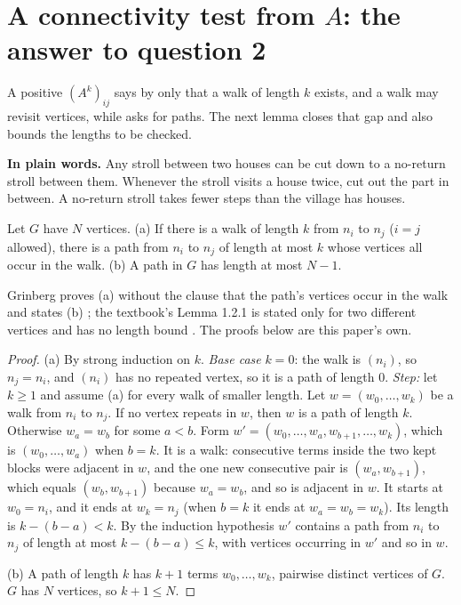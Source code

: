 \section{A connectivity test from $A$: the answer to question 2}\label{sec:connectivity}

A positive $(A^k)_{ij}$ says by  only that a walk of length $k$ exists, and a walk may revisit vertices, while  asks for paths. The next lemma closes that gap and also bounds the lengths to be checked.

\plainstart\textbf{In plain words.} Any stroll between two houses can be cut down to a no-return stroll between them. Whenever the stroll visits a house twice, cut out the part in between. A no-return stroll takes fewer steps than the village has houses.\plainend
\begin{lemma}\label{lem:walkpath}
Let $G$ have $N$ vertices.
(a) If there is a walk of length $k$ from $n_i$ to $n_j$ ($i = j$ allowed), there is a path from $n_i$ to $n_j$ of length at most $k$ whose vertices all occur in the walk.
(b) A path in $G$ has length at most $N - 1$.
\end{lemma}

Grinberg proves (a) without the clause that the path's vertices occur in the walk and states (b) \cite[Corollary 2.9.7, p.~39; p.~40]{grinberg_graph_theory}; the textbook's Lemma 1.2.1 is stated only for two different vertices and has no length bound \cite[p.~23]{petrosyan_graph_theory}. The proofs below are this paper's own.

\begin{proof}
(a) By strong induction on $k$. \emph{Base case} $k = 0$: the walk is $(n_i)$, so $n_j = n_i$, and $(n_i)$ has no repeated vertex, so it is a path of length $0$. \emph{Step:} let $k \ge 1$ and assume (a) for every walk of smaller length. Let $w = (w_0, \dots, w_k)$ be a walk from $n_i$ to $n_j$. If no vertex repeats in $w$, then $w$ is a path of length $k$. Otherwise $w_a = w_b$ for some $a < b$. Form $w' = (w_0, \dots, w_a, w_{b+1}, \dots, w_k)$, which is $(w_0, \dots, w_a)$ when $b = k$. It is a walk: consecutive terms inside the two kept blocks were adjacent in $w$, and the one new consecutive pair is $(w_a, w_{b+1})$, which equals $(w_b, w_{b+1})$ because $w_a = w_b$, and so is adjacent in $w$. It starts at $w_0 = n_i$, and it ends at $w_k = n_j$ (when $b = k$ it ends at $w_a = w_b = w_k$). Its length is $k - (b - a) < k$. By the induction hypothesis $w'$ contains a path from $n_i$ to $n_j$ of length at most $k - (b-a) \le k$, with vertices occurring in $w'$ and so in $w$.

(b) A path of length $k$ has $k + 1$ terms $w_0, \dots, w_k$, pairwise distinct vertices of $G$. $G$ has $N$ vertices, so $k + 1 \le N$.
\end{proof}

